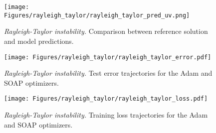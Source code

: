 \begin{figure}
    \centering
    \texttt{[image: Figures/rayleigh\_taylor/rayleigh\_taylor\_pred\_uv.png]}
\caption{{\em Rayleigh-Taylor instability.} Comparison between reference solution and model predictions.}
    \label{fig:rayleigh_taylor_pred_uv}
\end{figure}


\begin{figure}
    \centering
    \texttt{[image: Figures/rayleigh\_taylor/rayleigh\_taylor\_error.pdf]}
 \caption{{\em Rayleigh-Taylor instability.} Test error trajectories for the Adam and SOAP optimizers.}
    \label{fig:rayleigh_taylor_error}
\end{figure}

\begin{figure}
    \centering
    \texttt{[image: Figures/rayleigh\_taylor/rayleigh\_taylor\_loss.pdf]}
 \caption{{\em Rayleigh-Taylor instability.} Training loss trajectories for the Adam and SOAP optimizers.}
    \label{fig:rayleigh_taylor_loss}
\end{figure}









